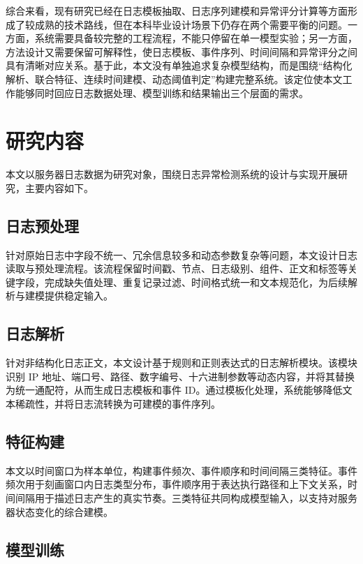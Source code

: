 综合来看，现有研究已经在日志模板抽取、日志序列建模和异常评分计算等方面形成了较成熟的技术路线，但在本科毕业设计场景下仍存在两个需要平衡的问题。一方面，系统需要具备较完整的工程流程，不能只停留在单一模型实验；另一方面，方法设计又需要保留可解释性，使日志模板、事件序列、时间间隔和异常评分之间具有清晰对应关系。基于此，本文没有单独追求复杂模型结构，而是围绕“结构化解析、联合特征、连续时间建模、动态阈值判定”构建完整系统。该定位使本文工作能够同时回应日志数据处理、模型训练和结果输出三个层面的需求。

\section{研究内容}

本文以服务器日志数据为研究对象，围绕日志异常检测系统的设计与实现开展研究，主要内容如下。

\subsection{日志预处理}

针对原始日志中字段不统一、冗余信息较多和动态参数复杂等问题，本文设计日志读取与预处理流程。该流程保留时间戳、节点、日志级别、组件、正文和标签等关键字段，完成缺失值处理、重复记录过滤、时间格式统一和文本规范化，为后续解析与建模提供稳定输入。

\subsection{日志解析}

针对非结构化日志正文，本文设计基于规则和正则表达式的日志解析模块。该模块识别 IP 地址、端口号、路径、数字编号、十六进制参数等动态内容，并将其替换为统一通配符，从而生成日志模板和事件 ID。通过模板化处理，系统能够降低文本稀疏性，并将日志流转换为可建模的事件序列。

\subsection{特征构建}

本文以时间窗口为样本单位，构建事件频次、事件顺序和时间间隔三类特征。事件频次用于刻画窗口内日志类型分布，事件顺序用于表达执行路径和上下文关系，时间间隔用于描述日志产生的真实节奏。三类特征共同构成模型输入，以支持对服务器状态变化的综合建模。

\subsection{模型训练}

